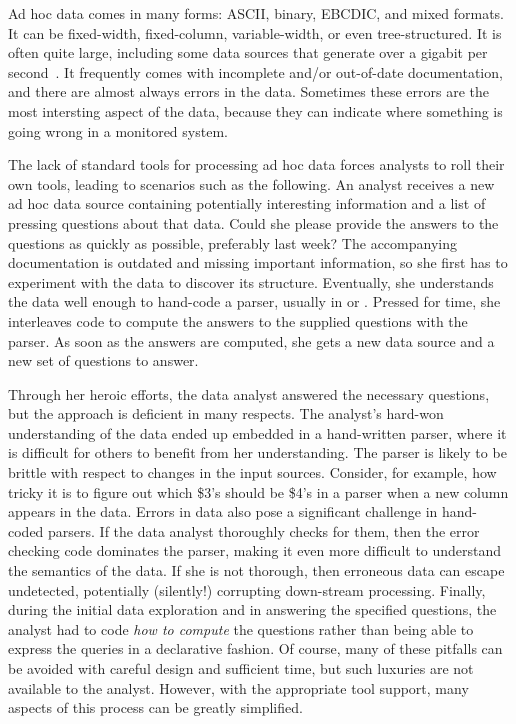 Ad hoc data comes in many forms: ASCII, binary, EBCDIC, and mixed
formats.  It can be fixed-width, fixed-column, variable-width, or even
tree-structured. It is often quite large, including some data sources
that generate over a gigabit per second~\cite{gigascope}. It frequently
comes with incomplete and/or out-of-date documentation, and there are
almost always errors in the data.  Sometimes these errors are the most
intersting aspect of the data, because they can indicate where
something is going wrong in a monitored system.

The lack of standard tools for processing ad hoc data forces
analysts to roll their own tools, leading to scenarios such as the
following.  An analyst receives a new ad hoc data source containing
potentially interesting information and a list of pressing questions
about that data.  Could she please provide the answers to the
questions as quickly as possible, preferably last week?  The
accompanying documentation is outdated and missing important
information, so she first has to experiment with the data to discover
its structure.   Eventually, she understands the data well enough to hand-code a
parser, usually in \C{} or \perl{}.  Pressed for time, she interleaves
code to compute the answers to the supplied questions with the parser.
As soon as the answers are computed, she gets a new data source and a
new set of questions to answer.

Through her heroic efforts, the data analyst answered
the necessary questions, but the approach is deficient in many
respects.  
The analyst's hard-won understanding of the data ended up embedded in
a hand-written parser, where it is difficult for others to benefit
from her understanding.
The parser is likely to be brittle with respect to changes in the
input sources.  Consider, for example, how tricky it is to
figure out which \$3's should be \$4's in a \perl{} parser when a new
column appears in the data.
Errors in data also pose a significant challenge in hand-coded
parsers.  If the data analyst thoroughly checks for them, then
the error checking code dominates the parser, making it even more
difficult to understand the semantics of the data.  If she is not thorough,
then erroneous data can escape undetected, potentially (silently!)
corrupting down-stream processing.
Finally, during the initial data exploration and in answering the
specified questions, the analyst had to code \textit{how to compute}
the questions rather than being able to express the queries in a
declarative fashion. 
Of course, many of these pitfalls can be avoided with careful design
and sufficient time, but such luxuries are not available to the analyst.
However, with the appropriate tool support, many aspects of this
process can be greatly simplified.


